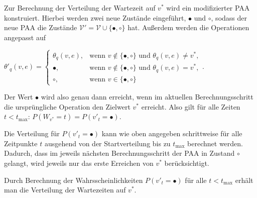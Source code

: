 Zur Berechnung der Verteilung der Wartezeit auf $v^*$ wird ein modifizierter PAA konstruiert. Hierbei werden zwei neue Zustände eingeführt, $\bullet$ und $\circ$, sodass der neue PAA die Zustände $\mathcal{V}' = \mathcal{V} \cup \{\bullet, \circ\}$ hat. Außerdem werden die Operationen angepasst auf

$ \theta'_q(v,e)=
\begin{cases}
\theta_q(v,e), 	& \text{wenn } v \notin \{\bullet, \circ\} \text{ und } \theta_q(v,e) \neq v^* ,\\
\bullet,	& \text{wenn } v \notin \{\bullet, \circ\} \text{ und } \theta_q(v,e) = v^* ,  \\
\circ, 		& \text{wenn } v \in \{\bullet, \circ\}
\end{cases}$.

Der Wert $\bullet$ wird also genau dann erreicht, wenn im aktuellen Berechnungsschritt die ursprüngliche Operation den Zielwert $v^*$ erreicht. Also gilt für alle Zeiten $t < t_{\text{max}}$: $P(W_{v^*} = t) = P(v'_t = \bullet)$.

Die Verteilung für $P(v'_{t} = \bullet)$ kann wie oben angegeben schrittweise für alle Zeitpunkte $t$ ausgehend von der Startverteilung bis zu $t_{\text{max}}$ berechnet werden. Dadurch, dass im jeweils nächsten Berechnungsschritt der PAA in Zustand $\circ$ gelangt, wird jeweils nur das erste Erreichen von $v^*$ berücksichtigt.

Durch Berechnung der Wahrsscheinlichkeiten $P(v'_{t} = \bullet)$ für alle $t < t_{\text{max}}$ erhält man die Verteilung der Wartezeiten auf $v^*$.

